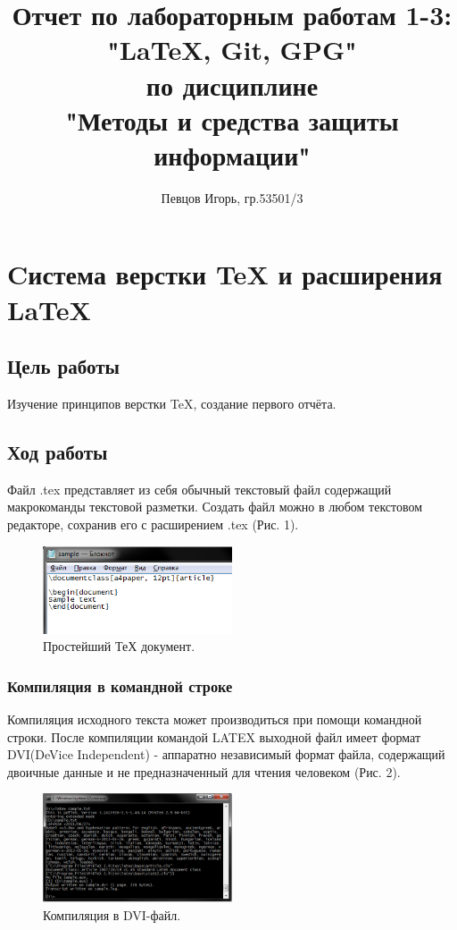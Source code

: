 \documentclass[a4paper, 14pt]{article}				%
\author{Певцов Игорь, гр.53501/3}
\title{Отчет по лабораторным работам 1-3:\\"\LaTeX{}, Git, GPG"\\ по дисциплине\\"Методы и средства защиты информации"}
\begin{document}
\maketitle

\newpage
\tableofcontents{}

\newpage

\section{Cистема верстки \TeX{} и расширения \LaTeX{}}

\subsection{Цель работы}
Изучение принципов верстки \TeX{}, создание первого отчёта.
\subsection{Ход работы}
Файл .tex представляет из себя обычный текстовый файл содержащий макрокоманды текстовой разметки. Создать файл можно в любом текстовом редакторе, сохранив его с расширением .tex (Рис. 1).

\begin{figure}[h!]
\centering
\includegraphics[width=0.5\textwidth]{fig1}
\caption{Простейший ТеХ документ.}
\end{figure}

\subsubsection{Компиляция в командной строке}
Компиляция исходного текста может производиться при помощи командной строки. После компиляции командой LATEX выходной файл имеет формат DVI(DeVice Independent) - аппаратно независимый формат файла, содержащий двоичные данные и не предназначенный для чтения человеком (Рис. 2). 

\begin{figure}[h!]
\centering
\includegraphics[width=0.5\textwidth]{fig2}
\caption{Компиляция в DVI-файл.}
\end{figure}
\end{document}
